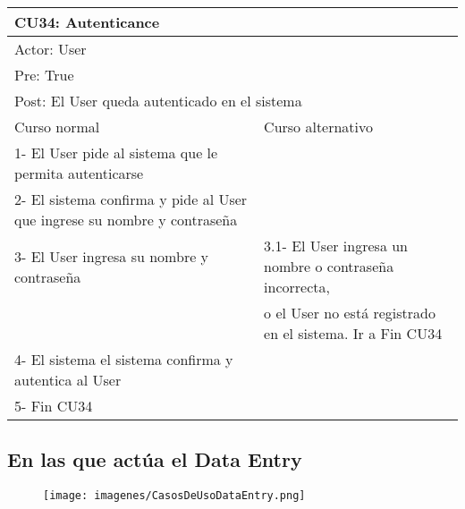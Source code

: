 \begin{table}[H]
  \begin{adjustbox}{max width = \textwidth}
  \begin{tabular}{|l|l|}
    \hline
    \multicolumn{2}{|l|}{CU34: Autenticance} \\\hline
    \multicolumn{2}{|l|}{Actor: User} \\\hline
    \multicolumn{2}{|l|}{Pre: True} \\\hline
    \multicolumn{2}{|l|}{Post: El User queda autenticado en el sistema} \\\hline
     Curso normal & Curso alternativo\\ \hline
     1- El User pide al sistema que le permita autenticarse & \\ \hline
     2- El sistema confirma y pide al User que ingrese su nombre y contraseña & \\ \hline
     3- El User ingresa su nombre y contraseña & 3.1- El User ingresa un nombre o contraseña incorrecta, \\ & o el User no está registrado en el sistema. Ir a Fin CU34 \\ \hline
     4- El sistema el sistema confirma y autentica al User & \\ \hline
     5- Fin CU34 & \\ \hline
  \end{tabular}
  \end{adjustbox}
\end{table}

\subsection{En las que actúa el Data Entry}

\begin{figure}[H]
    \texttt{[image: imagenes/CasosDeUsoDataEntry.png]}
\end{figure}

